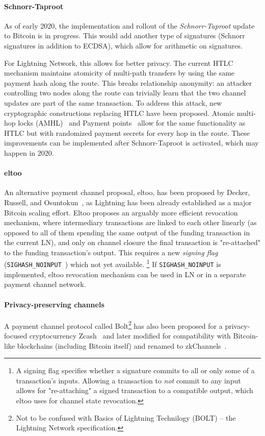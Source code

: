 \paragraph{Schnorr-Taproot}
As of early 2020, the implementation and rollout of the \textit{Schnorr-Taproot} update to Bitcoin is in progress.
This would add another type of signatures (Schnorr signatures in addition to ECDSA), which allow for arithmetic on signatures.

For Lightning Network, this allows for better privacy.
The current HTLC mechanism maintains atomicity of multi-path transfers by using the same payment hash along the route.
This breaks relationship anonymity: an attacker controlling two nodes along the route can trivially learn that the two channel updates are part of the same transaction.
To address this attack, new cryptographic constructions replacing HTLC have been proposed.
Atomic multi-hop locks (AMHL)~\cite{Malavolta2019} and Payment points~\cite{Kohen2019} allow for the same functionality as HTLC but with randomized payment secrets for every hop in the route.
These improvements can be implemented after Schnorr-Taproot is activated, which may happen in 2020.

\paragraph{eltoo}
An alternative payment channel proposal, eltoo, has been proposed by Decker, Russell, and Osuntokun~\cite{Decker2018}, as Lightning has been already established as a major Bitcoin scaling effort.
Eltoo proposes an arguably more efficient revocation mechanism, where intermediary transactions are linked to each other linearly (as opposed to all of them spending the same output of the funding transaction in the current LN), and only on channel closure the final transaction is "re-attached" to the funding transaction's output.
This requires a new \textit{signing flag} (\texttt{SIGHASH\_NOINPUT}~\cite{Decker2017}) which not yet available.
\footnote{A signing flag specifies whether a signature commits to all or only some of a transaction's inputs. Allowing a transaction to \textit{not} commit to any input allows for "re-attaching" a signed transaction to a compatible output, which eltoo uses for channel state revocation.}
If \texttt{SIGHASH\_NOINPUT} is implemented, eltoo revocation mechanism can be used in LN or in a separate payment channel network.

\paragraph{Privacy-preserving channels}
A payment channel protocol called Bolt\footnote{Not to be confused with Basics of Lightning Technilogy (BOLT) -- the Lightning Network specification.} has also been proposed for a privacy-focused cryptocurrency Zcash~\cite{Green2017} and later modified for compatibility with Bitcoin-like blockchains (including Bitcoin itself) and renamed to zkChannels~\cite{Akinyele2020}.


